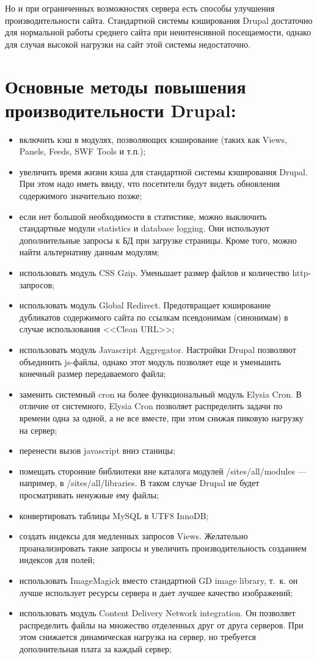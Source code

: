 \documentclass[10pt, a5paper]{article}
\begin{document}
Но и при ограниченных возможностях сервера есть способы улучшения производительности сайта. Стандартной системы кэширования Drupal достаточно для нормальной работы среднего сайта при неинтенсивной посещаемости, однако для случая высокой нагрузки на сайт этой системы недостаточно.

\section*{Основные методы повышения производительности Drupal:}
\begin{itemize}
	\item включить кэш в модулях, позволяющих кэширование (таких как Views, Panels, Feeds, SWF Tools и т.п.);
	\item увеличить время жизни кэша для стандартной системы кэширования Drupal. При этом надо иметь ввиду, что посетители будут видеть обновления содержимого значительно позже;
	\item если нет большой необходимости в статистике, можно выключить стандартные модули statistics и database logging. Они используют дополнительные запросы к БД при загрузке страницы. Кроме того, можно найти альтернативу данным модулям;
	\item использовать модуль CSS Gzip. Уменьшает размер файлов и количество http-запросов;
	\item использовать модуль Global Redirect. Предотвращает кэширование дубликатов содержимого сайта по ссылкам псевдонимам (синонимам) в случае использования <<Clean URL>>;
	\item использовать модуль Javascript Aggregator. Настройки Drupal позволяют объединить js-файлы, однако этот модуль позволяет еще и уменьшить конечный размер передаваемого файла;
	\item заменить системный cron на более функциональный модуль Elysia Cron. В отличие от системного, Elysia Cron позволяет распределить задачи по времени одна за одной, а не все вместе, при этом снижая пиковую нагрузку на сервер;
	\item перенести вызов javascript вниз станицы;
	\item помещать сторонние библиотеки вне каталога модулей /sites/all/modules --- например, в /sites/all/libraries. В таком случае Drupal не будет просматривать ненужные ему файлы;
	\item конвертировать таблицы MySQL в UTF8 InnoDB;
	\item создать индексы для медленных запросов Views. Желательно проанализировать такие запросы и увеличить производительность созданием индексов для полей;
	\item использовать ImageMagick вместо стандартной GD image library, т.~к. он лучше использует ресурсы сервера и дает лучшее качество изображений;
	\item использовать модуль Content Delivery Network integration. Он позволяет распределить файлы на множество отделенных друг от друга серверов. При этом снижается динамическая нагрузка на сервер, но требуется дополнительная плата за каждый сервер;
\end{itemize}
\end{document}
